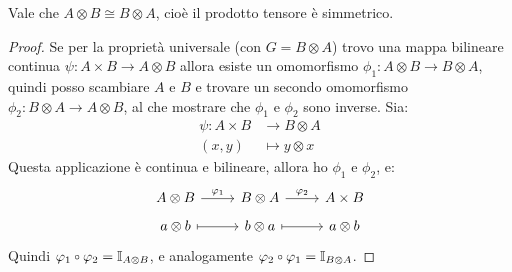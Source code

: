 \begin{proposition}
  Vale che $ A \otimes B \cong B \otimes A $, cioè il prodotto tensore è simmetrico.
\end{proposition}
\begin{proof}
  Se per la proprietà universale (con $ G = B \otimes A $) trovo una mappa bilineare continua
  $ \psi \colon A \times B \to A \otimes B $ allora esiste un omomorfismo
  $ \phi_1 \colon A \otimes B \to B \otimes A $, quindi posso scambiare $ A $ e
  $ B $ e trovare un secondo omomorfismo
  $ \phi_2 \colon B \otimes A \to A \otimes B $, al che mostrare che $ \phi_1 $ e $ \phi_2 $ sono inverse.
  Sia:
  \begin{align*}
    \psi \colon A \times B & \to B \otimes A \\
    (x,y) & \mapsto y \otimes x
  \end{align*}
  Questa applicazione è continua e bilineare, allora ho $ \phi_1 $ e $ \phi_2 $, e:
  \[
    \begin{tikzcd}[nodes = {row sep=5pt}]
      A \otimes B \rar{\phi_1} & B \otimes A \rar{\phi_2} & A \times B \\
      a \otimes b \arrow[mapsto]{r} & b \otimes a \arrow[mapsto]{r} & a \otimes b
    \end{tikzcd}
  \]
  Quindi $ \phi_1 \circ \phi_2 = \Id{A \otimes B} $, e analogamente  $ \phi_2 \circ \phi_1 = \Id{B \otimes A} $.
\end{proof}

